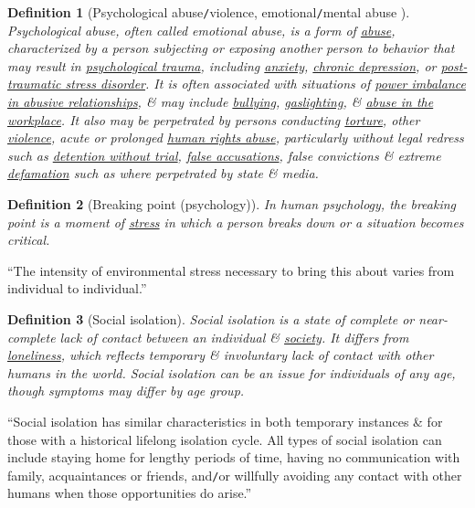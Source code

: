 \documentclass[12pt,oneside]{book}
\newtheorem{definition}{Definition}[section]
\begin{document}
\begin{definition}[Psychological abuse{\tt/}violence, emotional{\tt/}mental abuse ]
	\emph{Psychological abuse}, often called \emph{emotional abuse}, is a form of \href{https://en.wikipedia.org/wiki/Abuse}{abuse}, characterized by a person subjecting or exposing another person to behavior that may result in \href{https://en.wikipedia.org/wiki/Psychological_trauma}{psychological trauma}, including \href{https://en.wikipedia.org/wiki/Anxiety_disorder}{anxiety}, \href{https://en.wikipedia.org/wiki/Chronic_depression}{chronic depression}, or \href{https://en.wikipedia.org/wiki/Post-traumatic_stress_disorder}{post-traumatic stress disorder}. It is often associated with situations of \href{https://en.wikipedia.org/wiki/Abusive_power_and_control}{power imbalance in abusive relationships}, \& may include \href{https://en.wikipedia.org/wiki/Bullying}{bullying}, \href{https://en.wikipedia.org/wiki/Gaslighting}{gaslighting}, \& \href{https://en.wikipedia.org/wiki/Workplace_bullying}{abuse in the workplace}. It also may be perpetrated by persons conducting \href{https://en.wikipedia.org/wiki/Torture}{torture}, other \href{https://en.wikipedia.org/wiki/Violence}{violence}, acute or prolonged \href{https://en.wikipedia.org/wiki/Human_rights_abuse}{human rights abuse}, particularly without legal redress such as \href{https://en.wikipedia.org/wiki/Detention_without_trial}{detention without trial}, \href{https://en.wikipedia.org/wiki/False_accusation}{false accusations}, false convictions \& extreme \href{https://en.wikipedia.org/wiki/Defamation}{defamation} such as where perpetrated by state \& media. 
\end{definition}

\begin{definition}[Breaking point (psychology)]
	In human psychology, the \emph{breaking point} is a moment of \href{https://en.wikipedia.org/wiki/Stress_(medicine)}{stress} in which a person breaks down or a situation becomes critical.
\end{definition}
``The intensity of environmental stress necessary to bring this about varies from individual to individual.''

\begin{definition}[Social isolation]
	\emph{Social isolation} is a state of complete or near-complete lack of contact between an individual \& \href{https://en.wikipedia.org/wiki/Society}{society}. It differs from \href{https://en.wikipedia.org/wiki/Loneliness}{loneliness}, which reflects temporary \& involuntary lack of contact with other humans in the world. Social isolation can be an issue for individuals of any age, though symptoms may differ by age group.
\end{definition}
``Social isolation has similar characteristics in both temporary instances \& for those with a historical lifelong isolation cycle. All types of social isolation can include staying home for lengthy periods of time, having no communication with family, acquaintances or friends, and{\tt/}or willfully avoiding any contact with other humans when those opportunities do arise.''
\end{document}
